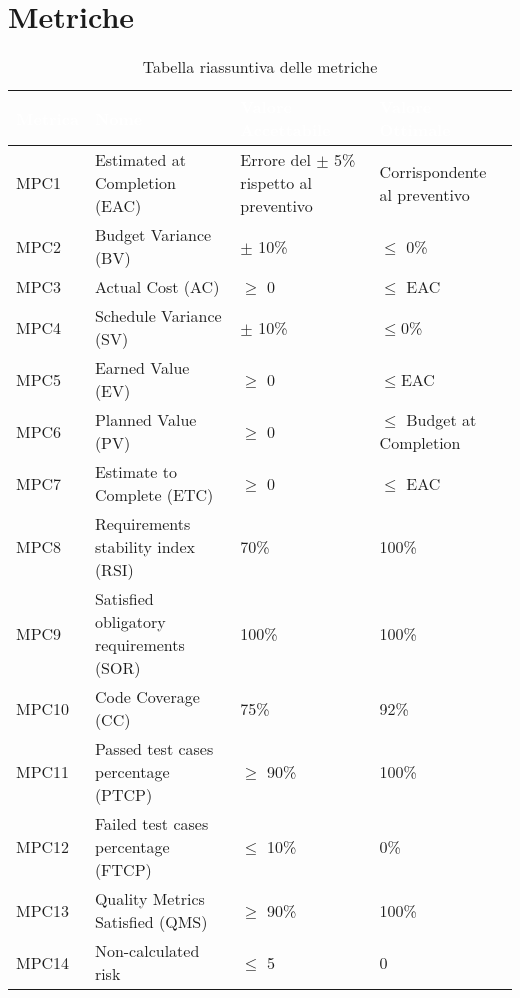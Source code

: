 \section{Metriche}
\begin{table}[H]
  \renewcommand{\arraystretch}{1.25}
  \begin{tabular}{|p{1.7cm}|p{3.5cm}|p{4cm}|p{3.3cm}|} \hline
    \rowcolor[HTML]{036400}
    \textcolor{white}{\textbf{Metrica}} & \textcolor{white}{\textbf{Nome}} & \textcolor{white}{\textbf{Valore Accettabile}} & \textcolor{white}{\textbf{Valore Ottimale}}    \\ \hline
      \rowcolor[HTML]{EFEFEF}
      MPC1 & Estimated at Completion (EAC)&  Errore del $\pm$ 5\% rispetto al preventivo & Corrispondente al preventivo   \\ \hline
      \rowcolor[HTML]{C0C0C0}
      MPC2 & Budget Variance (BV) & $\pm$ 10\%  & $\leq$ 0\%    \\ \hline
      \rowcolor[HTML]{EFEFEF}
      MPC3 & Actual Cost (AC)   & $\geq$ 0  & $\leq$ EAC    \\ \hline
      \rowcolor[HTML]{C0C0C0}
      MPC4 & Schedule Variance (SV) &$ \pm$ 10\% & $\leq$0\%     \\ \hline
      \rowcolor[HTML]{EFEFEF}
      MPC5 & Earned Value (EV) & $\geq$ 0  & $\leq$EAC   \\ \hline
      \rowcolor[HTML]{C0C0C0}
      MPC6 & Planned Value (PV) & $\geq$ 0 & $\leq$ Budget at Completion   \\ \hline
      \rowcolor[HTML]{EFEFEF}
      MPC7 & Estimate to Complete (ETC) & $\geq$ 0  & $\leq$ EAC   \\ \hline
      \rowcolor[HTML]{C0C0C0}
      MPC8 & Requirements stability index (RSI) & 70\% & 100\%   \\ \hline
      \rowcolor[HTML]{EFEFEF}
      MPC9 & Satisfied obligatory requirements (SOR) & 100\%  & 100\%   \\ \hline
      \rowcolor[HTML]{C0C0C0}
      MPC10 & Code Coverage (CC)& 75\% & 92\%   \\ \hline
      \rowcolor[HTML]{EFEFEF}
      MPC11 & Passed test cases percentage (PTCP) & $\geq$ 90\%  &  100\%  \\ \hline
      \rowcolor[HTML]{C0C0C0}
      MPC12 & Failed test cases percentage (FTCP) & $\leq$ 10\% &  0\% \\ \hline
      \rowcolor[HTML]{EFEFEF}
      MPC13 & Quality Metrics Satisfied (QMS) & $\geq$ 90\%  & 100\%   \\ \hline
      \rowcolor[HTML]{C0C0C0}
      MPC14 & Non-calculated risk & $\leq$ 5& 0   \\ \hline
  \end{tabular}
  \caption{Tabella riassuntiva delle metriche}
\end{table}
